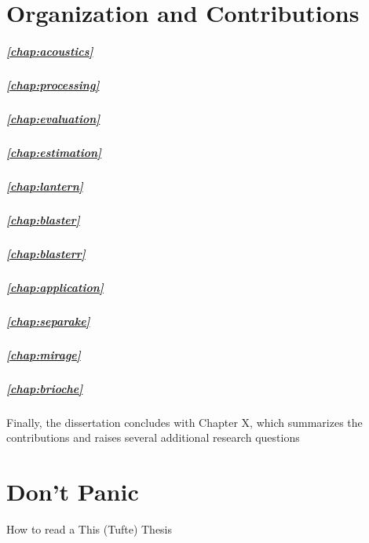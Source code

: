 \section{Organization and Contributions}
\subparagraph{\cref{chap:acoustics}}\blindtext
\subparagraph{\cref{chap:processing}}\blindtext
\subparagraph{\cref{chap:evaluation}}\blindtext

\subparagraph{\cref{chap:estimation}}\blindtext
\subparagraph{\cref{chap:lantern}}\blindtext
\subparagraph{\cref{chap:blaster}}\blindtext
\subparagraph{\cref{chap:blasterr}}\blindtext


\subparagraph{\cref{chap:application}}\blindtext
\subparagraph{\cref{chap:separake}}\blindtext
\subparagraph{\cref{chap:mirage}}\blindtext
\subparagraph{\cref{chap:brioche}}\blindtext


Finally, the dissertation concludes with Chapter X, which summarizes
the contributions and raises several additional research questions


\section{Don't Panic}
How to read a This (Tufte) Thesis